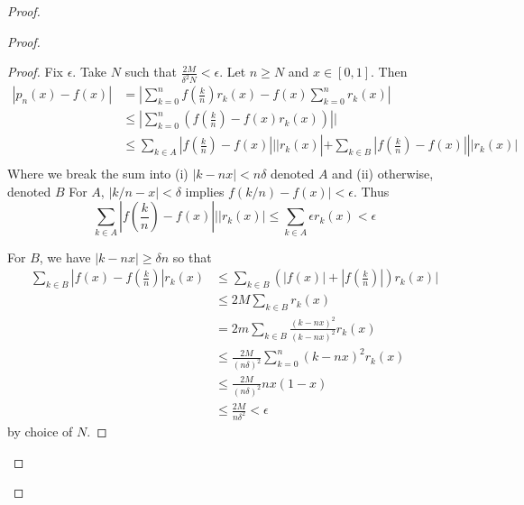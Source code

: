 \documentclass[12pt, a4paper]{book}
\theoremstyle{nonumberplain}
\newtheorem{proof}{Proof}
\begin{document}
\begin{proof}
\begin{proof}
\begin{proof}
    Fix $\epsilon$.
    Take $N$ such that $\frac{2M}{\delta^2N}<\epsilon$.
    Let $n\geq N$ and $x\in[0,1]$.
    Then
    \begin{align*}
        |p_n(x)-f(x)|&=\left\lvert\sum\limits_{k=0}^n f\left(\frac{k}{n}\right)r_k(x)-f(x)\sum\limits_{k=0}^nr_k(x)\right\rvert\\
                     &\leq\left\lvert\sum\limits_{k=0}^n \left(f\left(\frac{k}{n}\right)-f(x)r_k(x)\right)\right\rvert|\\
                     &\leq \sum_{k\in A}\left\lvert f\left(\frac{k}{n}\right)-f(x)\right\rvert||r_k(x)|+\sum_{k\in B}\left\lvert f\left(\frac{k}{n}\right)-f(x)\right\rvert||r_k(x)|\\
    \end{align*}
    Where we break the sum into (i) $|k-nx|<n\delta$ denoted $A$ and (ii) otherwise, denoted $B$
    For $A$, $|k/n-x|<\delta$ implies $f(k/n)-f(x)|<\epsilon$.
    Thus
    \[\sum\limits_{k\in A}\left\lvert f\left(\frac{k}{n}\right)-f(x)\right\rvert||r_k(x)|\leq\sum\limits_{k\in A}\epsilon r_k(x)<\epsilon\]

    For $B$, we have $|k-nx|\geq\delta n$ so that
    \begin{align*}
        \sum\limits_{k\in B}\left\lvert f(x)-f\left(\frac{k}{n}\right)\right\rvert r_k(x) &\leq \sum\limits_{k\in B}\left(|f(x)|+\left\lvert f\left(\frac{k}{n}\right)\right\rvert\right)r_k(x)|\\
                                                                             &\leq 2M\sum\limits_{k\in B}r_k(x)\\
                                                                             &= 2m\sum\limits_{k\in B}\frac{(k-nx)^2}{(k-nx)^2}r_k(x)\\
                                                                             &\leq\frac{2M}{(n\delta)^2}\sum\limits_{k=0}^n(k-nx)^2r_k(x)\\
                                                                             &\leq\frac{2M}{(n\delta)^2}nx(1-x)\\
                                                                             &\leq\frac{2M}{n\delta^2}<\epsilon
    \end{align*}
    by choice of $N$.
\end{proof}

\end{proof}
\end{proof}
\end{document}

